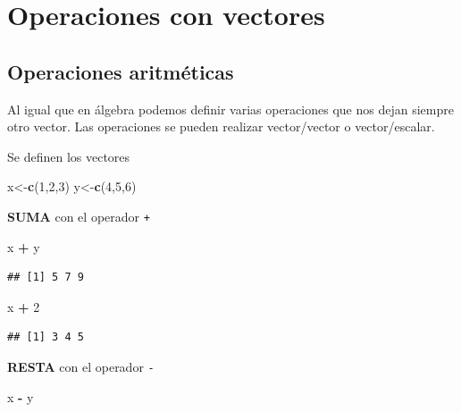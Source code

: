 \documentclass[
]{book}
\newenvironment{Shaded}{\begin{snugshade}}{\end{snugshade}}
\newcommand{\DecValTok}[1]{\textcolor[rgb]{0.00,0.00,0.81}{#1}}
\newcommand{\FunctionTok}[1]{\textcolor[rgb]{0.13,0.29,0.53}{\textbf{#1}}}
\newcommand{\NormalTok}[1]{#1}
\newcommand{\OtherTok}[1]{\textcolor[rgb]{0.56,0.35,0.01}{#1}}
\newcommand{\SpecialCharTok}[1]{\textcolor[rgb]{0.81,0.36,0.00}{\textbf{#1}}}
\begin{document}
\section{Operaciones con vectores}\label{operaciones-con-vectores}

\subsection{Operaciones aritméticas}\label{operaciones-aritmuxe9ticas-1}

Al igual que en álgebra podemos definir varias operaciones que nos dejan siempre otro vector. Las operaciones se pueden realizar vector/vector o vector/escalar.

Se definen los vectores

\begin{Shaded}
\begin{Highlighting}[]
\NormalTok{x}\OtherTok{\textless{}{-}}\FunctionTok{c}\NormalTok{(}\DecValTok{1}\NormalTok{,}\DecValTok{2}\NormalTok{,}\DecValTok{3}\NormalTok{)}
\NormalTok{y}\OtherTok{\textless{}{-}}\FunctionTok{c}\NormalTok{(}\DecValTok{4}\NormalTok{,}\DecValTok{5}\NormalTok{,}\DecValTok{6}\NormalTok{)}
\end{Highlighting}
\end{Shaded}

\textbf{SUMA} con el operador \texttt{+}

\begin{Shaded}
\begin{Highlighting}[]
\NormalTok{x }\SpecialCharTok{+}\NormalTok{ y }
\end{Highlighting}
\end{Shaded}

\begin{verbatim}
## [1] 5 7 9
\end{verbatim}

\begin{Shaded}
\begin{Highlighting}[]
\NormalTok{x }\SpecialCharTok{+} \DecValTok{2}
\end{Highlighting}
\end{Shaded}

\begin{verbatim}
## [1] 3 4 5
\end{verbatim}

\textbf{RESTA} con el operador \texttt{-}

\begin{Shaded}
\begin{Highlighting}[]
\NormalTok{x }\SpecialCharTok{{-}}\NormalTok{ y}
\end{Highlighting}
\end{Shaded}
\end{document}

